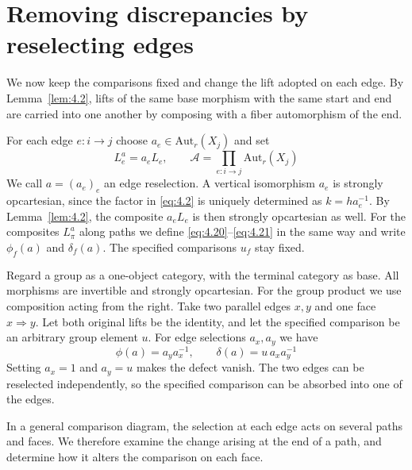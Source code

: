 \section{Removing discrepancies by reselecting edges}\label{sec:4.6}

We now keep the comparisons fixed and change the lift adopted on each edge.
By Lemma~\ref{lem:4.2}, lifts of the same base morphism with the same start and end are
carried into one another by composing with a fiber automorphism of the end.

\begin{definition}\label{def:4.19}

For each edge $e:i\to j$ choose
$a_e\in\mathrm{Aut}_r(X_j)$ and set
\begin{equation*}
L_e^a=a_eL_e,\qquad
\mathcal{A}=\prod_{e:i\to j}\mathrm{Aut}_r(X_j)
\tag{4.22}\label{eq:4.22}
\end{equation*}
We call $a=(a_e)_e$ an edge reselection.
A vertical isomorphism $a_e$ is strongly opcartesian, since the factor in \eqref{eq:4.2}
is uniquely determined as $k=ha_e^{-1}$. By Lemma~\ref{lem:4.2}, the composite $a_eL_e$ is
then strongly opcartesian as well.
For the composites $L_\pi^a$ along paths we define \eqref{eq:4.20}--\eqref{eq:4.21} in the
same way and write $\phi_f(a)$ and $\delta_f(a)$.
The specified comparisons $u_f$ stay fixed.

\end{definition}

\begin{example}\label{ex:4.20}

Regard a group as a one-object category, with the terminal category as base.
All morphisms are invertible and strongly opcartesian.
For the group product we use composition acting from the right.
Take two parallel edges $x,y$ and one face $x\Rightarrow y$.
Let both original lifts be the identity, and let the specified comparison be an arbitrary
group element $u$.
For edge selections $a_x,a_y$ we have
\begin{equation*}
\phi(a)=a_ya_x^{-1},\qquad
\delta(a)=u\,a_xa_y^{-1}
\tag{4.23}\label{eq:4.23}
\end{equation*}
Setting $a_x=1$ and $a_y=u$ makes the defect vanish.
The two edges can be reselected independently, so the specified comparison can be absorbed
into one of the edges.

In a general comparison diagram, the selection at each
edge acts on several paths and faces.
We therefore examine the change arising at the end of a path, and determine how it alters
the comparison on each face.

\end{example}

